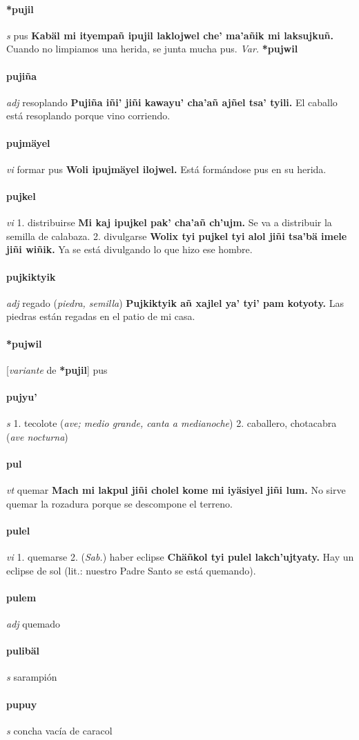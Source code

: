 \documentclass{scrbook}
\newcommand{\entry}[1]{\paragraph{#1}}
\newcommand{\onedefinition}[1]{#1.}
\newcommand{\partofspeech}[1]{\textit{#1}}
\newcommand{\spanishtranslation}[1]{#1}
\newcommand{\clarification}[1]{(\textit{#1})}
\newcommand{\cholexample}[1]{\textbf{#1}}
\newcommand{\exampletranslation}[1]{#1}
\newcommand{\relevantdialect}[1]{(\textit{#1})}
\newcommand{\variation}[1]{\textit{Var.} \textbf{#1}}
\newcommand{\conjugationtense}[1]{[\textit{#1}}
\newcommand{\conjugationverb}[1]{de \textbf{#1}]}
\begin{document}
\begin{multicols}{2}
\entry{*pujil}
\partofspeech{s}
\spanishtranslation{pus}
\cholexample{Kabäl mi ityempañ ipujil laklojwel che' ma'añik mi laksujkuñ.}
\exampletranslation{Cuando no limpiamos una herida, se junta mucha pus.}
\variation{*pujwil}

\entry{pujiña}
\partofspeech{adj}
\spanishtranslation{resoplando}
\cholexample{Pujiña iñi' jiñi kawayu' cha'añ ajñel tsa' tyili.}
\exampletranslation{El caballo está resoplando porque vino corriendo.}

\entry{pujmäyel}
\partofspeech{vi}
\spanishtranslation{formar pus}
\cholexample{Woli ipujmäyel ilojwel.}
\exampletranslation{Está formándose pus en su herida.}

\entry{pujkel}
\partofspeech{vi}
\onedefinition{1}
\spanishtranslation{distribuirse}
\cholexample{Mi kaj ipujkel pak' cha'añ ch'ujm.}
\exampletranslation{Se va a distribuir la semilla de calabaza.}
\onedefinition{2}
\spanishtranslation{divulgarse}
\cholexample{Wolix tyi pujkel tyi alol jiñi tsa'bä imele jiñi wiñik.}
\exampletranslation{Ya se está divulgando lo que hizo ese hombre.}

\entry{pujkiktyik}
\partofspeech{adj}
\spanishtranslation{regado}
\clarification{piedra, semilla}
\cholexample{Pujkiktyik añ xajlel ya' tyi' pam kotyoty.}
\exampletranslation{Las piedras están regadas en el patio de mi casa.}

\entry{*pujwil}
\conjugationtense{variante}
\conjugationverb{*pujil}
\spanishtranslation{pus}

\entry{pujyu'}
\partofspeech{s}
\onedefinition{1}
\spanishtranslation{tecolote}
\clarification{ave; medio grande, canta a medianoche}
\onedefinition{2}
\spanishtranslation{caballero, chotacabra}
\clarification{ave nocturna}

\entry{pul}
\partofspeech{vt}
\spanishtranslation{quemar}
\cholexample{Mach mi lakpul jiñi cholel kome mi iyäsiyel jiñi lum.}
\exampletranslation{No sirve quemar la rozadura porque se descompone el terreno.}

\entry{pulel}
\partofspeech{vi}
\onedefinition{1}
\spanishtranslation{quemarse}
\onedefinition{2}
\relevantdialect{Sab.}
\spanishtranslation{haber eclipse}
\cholexample{Chäñkol tyi pulel lakch'ujtyaty.}
\exampletranslation{Hay un eclipse de sol (lit.: nuestro Padre Santo se está quemando).}

\entry{pulem}
\partofspeech{adj}
\spanishtranslation{quemado}

\entry{pulibäl}
\partofspeech{s}
\spanishtranslation{sarampión}

\entry{pupuy}
\partofspeech{s}
\spanishtranslation{concha vacía de caracol}


\end{multicols}
\end{document}
